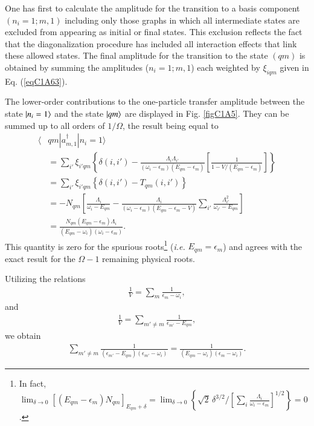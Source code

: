 One has  first to calculate the amplitude for the transition to a basis component $(n_i= 1; m, 1)$ including only those graphs in which all intermediate states are excluded from appearing as initial or final states. This exclusion reflects the fact that the diagonalization procedure has included all interaction effects that link these allowed states. The final amplitude for the transition to the state $(qm)$ is obtained by summing the amplitudes  ($n_i=1;m,1$) each weighted by  $\xi_{iqm}$ given in Eq. (\ref{eqC1A63}). 

The lower-order contributions to the one-particle transfer amplitude between the state $|{n_i=1} \rangle$ and the state $|{qm} \rangle$ are displayed in Fig. \ref{figC1A5}. They can be summed up to all orders of $1/\Omega$, the result being equal to 
  \begin{align}\label{eqC1A73} 
   \nonumber \langle & qm|a^\dagger_{m,1}|n_i=1\rangle\\
\nonumber &=\sum_{i'}\xi_{i'qm}\left\{\delta(i,i')-\frac{\Lambda_i\Lambda_{i'}}{(\omega_i-\epsilon_m)(E_{qm}-\epsilon_m)}\left[\frac{1}{1-V/(E_{qm}-\epsilon_m)}\right]\right\}\\
\nonumber &=\sum_{i'}\xi_{i'qm}\left\{\delta(i,i')-T_{qm}(i,i')\right\}\\
\nonumber & =-N_{qm}\left[\frac{\Lambda_i}{\omega_i-E_{qm}}-\frac{\Lambda_i}{(\omega_i-\epsilon_m)(E_{qm}-\epsilon_m-V)}\sum_{i'}\frac{\Lambda_{i'}^2}{\omega_{i'}-E_{qm}}\right]\\
&=\frac{N_{qm}(E_{qm}-\epsilon_m)\Lambda_i}{(E_{qm}-\omega_i)(\omega_i-\epsilon_m)}.
\end{align} 
This quantity is zero for the spurious roots\footnote{In fact, $\lim_{\delta\to0}[(E_{qm}-\epsilon_m)N_{qm}]_{E_{qm}+\delta}=\lim_{\delta\to0}\left\{\sqrt{2}\,\delta^{3/2}/[\sum_i\frac{\Lambda_i}{\omega_i-\epsilon_m}]^{1/2}\right\}=0$.} (\textit{i.e.} $E_{qm}=\epsilon_m$) and agrees with the exact result for the $\Omega-1$ remaining physical roots. 


Utilizing the relations
  \begin{align}\label{eqC1A74} 
  \frac{1}{V}=\sum_m\frac{1}{\epsilon_m-\omega_i},
    \end{align}  
and  
  \begin{align}\label{eqC1A75} 
   \frac{1}{V}=\sum_{m'\neq m}\frac{1}{\epsilon_{m'}-E_{qm}},
    \end{align} 
we  obtain  
  \begin{align}\label{eqC1A76} 
   \sum_{m'\neq m}\frac{1}{(\epsilon_{m'}-E_{qm})(\epsilon_{m'}-\omega_i)}=\frac{1}{(E_{qm}-\omega_i)(\epsilon_m-\omega_i)}.
    \end{align} 

